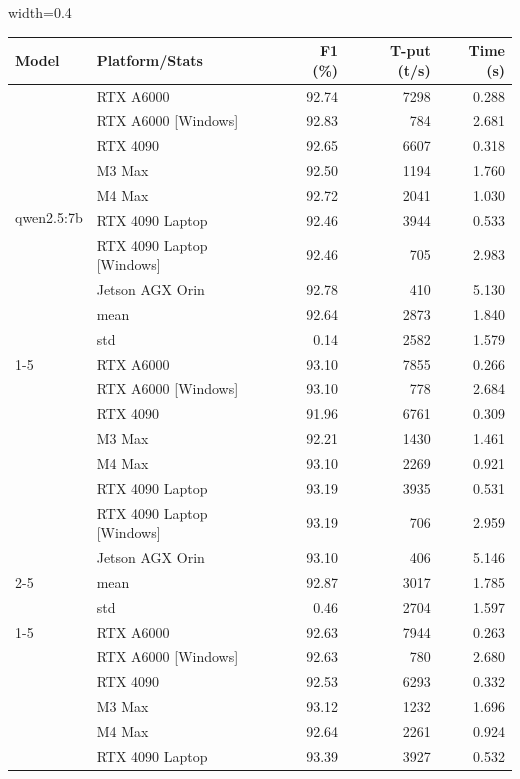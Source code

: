 \documentclass[conference]{IEEEtran}
\begin{document}
\begin{table}[htbp]
    \centering
    \begin{adjustbox}{width=0.4\textwidth}
    \begin{tabular}{llrrr}
\toprule
\textbf{Model} & \textbf{Platform/Stats} & \textbf{F1 (\%)} & \textbf{T-put (t/s)} & \textbf{Time (s)} \\
\midrule
\multirow[t]{10}{*}{qwen2.5:7b} & RTX A6000 & 92.74 & 7298 & 0.288 \\
 & RTX A6000 [Windows] & 92.83 & 784 & 2.681 \\
 & RTX 4090 & 92.65 & 6607 & 0.318 \\
 & M3 Max & 92.50 & 1194 & 1.760 \\
 & M4 Max & 92.72 & 2041 & 1.030 \\
 & RTX 4090 Laptop & 92.46 & 3944 & 0.533 \\
 & RTX 4090 Laptop [Windows] & 92.46 & 705 & 2.983 \\
 & Jetson AGX Orin & 92.78 & 410 & 5.130 \\
 \cmidrule(lr){2-5}
 & mean & 92.64 & 2873 & 1.840 \\
 & std & 0.14 & 2582 & 1.579 \\
\cline{1-5}
\multirow[t]{10}{*}{llama3.1:8b} & RTX A6000 & 93.10 & 7855 & 0.266 \\
 & RTX A6000 [Windows] & 93.10 & 778 & 2.684 \\
 & RTX 4090 & 91.96 & 6761 & 0.309 \\
 & M3 Max & 92.21 & 1430 & 1.461 \\
 & M4 Max & 93.10 & 2269 & 0.921 \\
 & RTX 4090 Laptop & 93.19 & 3935 & 0.531 \\
 & RTX 4090 Laptop [Windows] & 93.19 & 706 & 2.959 \\
 & Jetson AGX Orin & 93.10 & 406 & 5.146 \\
 \cmidrule(lr){2-5}
 & mean & 92.87 & 3017 & 1.785 \\
 & std & 0.46 & 2704 & 1.597 \\
\cline{1-5}
\multirow[t]{10}{*}{llama3.2-vision:11b} & RTX A6000 & 92.63 & 7944 & 0.263 \\
 & RTX A6000 [Windows] & 92.63 & 780 & 2.680 \\
 & RTX 4090 & 92.53 & 6293 & 0.332 \\
 & M3 Max & 93.12 & 1232 & 1.696 \\
 & M4 Max & 92.64 & 2261 & 0.924 \\
 & RTX 4090 Laptop & 93.39 & 3927 & 0.532 \\

\end{tabular}
\end{adjustbox}
\end{table}
\end{document}
